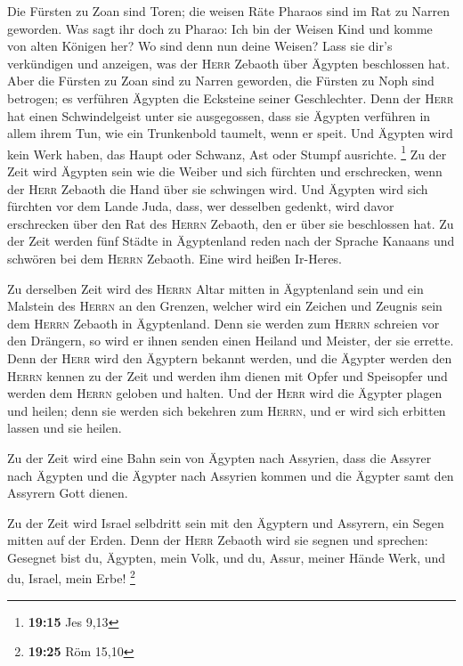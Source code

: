  Die Fürsten zu Zoan sind Toren; die weisen Räte Pharaos
sind im Rat zu Narren geworden. Was sagt ihr doch zu Pharao: Ich bin der
Weisen Kind und komme von alten Königen her?  Wo sind
denn nun deine Weisen? Lass sie dir's verkündigen und anzeigen, was der
\textsc{Herr} Zebaoth über Ägypten beschlossen hat.  Aber
die Fürsten zu Zoan sind zu Narren geworden, die Fürsten zu Noph sind
betrogen; es verführen Ägypten die Ecksteine seiner Geschlechter.
 Denn der \textsc{Herr} hat einen Schwindelgeist unter
sie ausgegossen, dass sie Ägypten verführen in allem ihrem Tun, wie ein
Trunkenbold taumelt, wenn er speit.  Und Ägypten wird
kein Werk haben, das Haupt oder Schwanz, Ast oder Stumpf ausrichte.
\footnote{\textbf{19:15} Jes 9,13}  Zu der Zeit wird
Ägypten sein wie die Weiber und sich fürchten und erschrecken, wenn der
\textsc{Herr} Zebaoth die Hand über sie schwingen wird. 
Und Ägypten wird sich fürchten vor dem Lande Juda, dass, wer desselben
gedenkt, wird davor erschrecken über den Rat des \textsc{Herrn} Zebaoth,
den er über sie beschlossen hat.  Zu der Zeit werden fünf
Städte in Ägyptenland reden nach der Sprache Kanaans und schwören bei
dem \textsc{Herrn} Zebaoth. Eine wird heißen Ir-Heres.

 Zu derselben Zeit wird des \textsc{Herrn} Altar mitten
in Ägyptenland sein und ein Malstein des \textsc{Herrn} an den Grenzen,
 welcher wird ein Zeichen und Zeugnis sein dem
\textsc{Herrn} Zebaoth in Ägyptenland. Denn sie werden zum
\textsc{Herrn} schreien vor den Drängern, so wird er ihnen senden einen
Heiland und Meister, der sie errette.  Denn der
\textsc{Herr} wird den Ägyptern bekannt werden, und die Ägypter werden
den \textsc{Herrn} kennen zu der Zeit und werden ihm dienen mit Opfer
und Speisopfer und werden dem \textsc{Herrn} geloben und halten.
 Und der \textsc{Herr} wird die Ägypter plagen und
heilen; denn sie werden sich bekehren zum \textsc{Herrn}, und er wird
sich erbitten lassen und sie heilen.

 Zu der Zeit wird eine Bahn sein von Ägypten nach
Assyrien, dass die Assyrer nach Ägypten und die Ägypter nach Assyrien
kommen und die Ägypter samt den Assyrern Gott dienen.

 Zu der Zeit wird Israel selbdritt sein mit den Ägyptern
und Assyrern, ein Segen mitten auf der Erden.  Denn der
\textsc{Herr} Zebaoth wird sie segnen und sprechen: Gesegnet bist du,
Ägypten, mein Volk, und du, Assur, meiner Hände Werk, und du, Israel,
mein Erbe! \footnote{\textbf{19:25} Röm 15,10}

